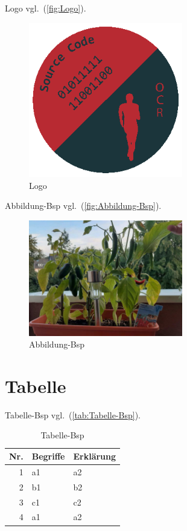 Logo vgl.~(\autoref{fig:Logo}).

\begin{figure}[!hb]%
\centering
\includegraphics[width=0.6\textwidth]{images/logo.eps}
\caption{Logo}
\label{fig:Logo}%
\end{figure}

Abbildung-Bsp vgl.~(\autoref{fig:Abbildung-Bsp}).

\begin{figure}[!hb]%
\centering
\includegraphics[width=0.6\textwidth]{images/Chili-1.pdf}
\caption{Abbildung-Bsp}
\label{fig:Abbildung-Bsp}%
\end{figure}

\section{Tabelle}\label{tabelle}

Tabelle-Bsp vgl.~(\autoref{tab:Tabelle-Bsp}).

\begin{table}[!ht]%
\centering 
	\caption{Tabelle-Bsp} \label{tab:Tabelle-Bsp}%
\begin{tabular}{@{}rll@{}}
\toprule
\textbf{Nr.} & \textbf{Begriffe} & \textbf{Erklärung}\\
\midrule
1 & a1 & a2\\
2 & b1 & b2\\
3 & c1 & c2\\
4 & a1 & a2\\
\bottomrule
\end{tabular} 
\end{table}

